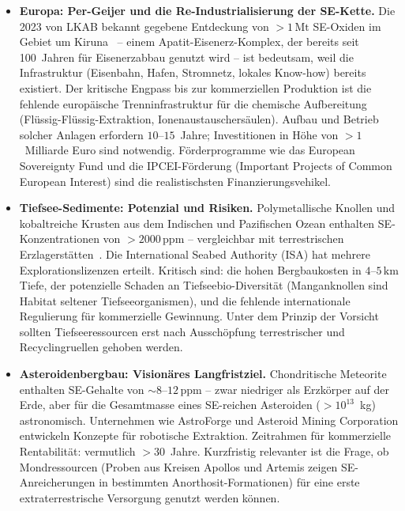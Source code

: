 ﻿\documentclass[12pt, a4paper]{report}
\theoremstyle{definition}
\theoremstyle{remark}
\begin{document}
\begin{itemize}
  \item \textbf{Europa: Per-Geijer und die Re-Industrialisierung der
        SE-Kette.}
    Die 2023 von LKAB bekannt gegebene Entdeckung von $>1\,\text{Mt}$
    SE-Oxiden im Gebiet um Kiruna~\cite{lkab2023} -- einem Apatit-Eisenerz-Komplex,
    der bereits seit 100~Jahren für Eisenerzabbau genutzt wird -- ist bedeutsam,
    weil die Infrastruktur (Eisenbahn, Hafen, Stromnetz, lokales Know-how)
    bereits existiert. Der kritische Engpass bis zur kommerziellen Produktion
    ist die fehlende europäische Trenninfrastruktur für die chemische
    Aufbereitung (Flüssig-Flüssig-Extraktion, Ionenaustauschersäulen). Aufbau
    und Betrieb solcher Anlagen erfordern $10$--$15$~Jahre; Investitionen in
    Höhe von $> 1$~Milliarde Euro sind notwendig. Förderprogramme wie das
    European Sovereignty Fund und die IPCEI-Förderung (Important Projects of
    Common European Interest) sind die realistischsten Finanzierungsvehikel.

  \item \textbf{Tiefsee-Sedimente: Potenzial und Risiken.}
    Polymetallische Knollen und kobaltreiche Krusten aus dem Indischen und
    Pazifischen Ozean enthalten SE-Konzentrationen von $>2000\,\text{ppm}$
    -- vergleichbar mit terrestrischen Erzlagerstätten~\cite{balaram2019}.
    Die International Seabed Authority (ISA) hat mehrere Explorationslizenzen
    erteilt. Kritisch sind: die hohen Bergbaukosten in $4$--$5\,\text{km}$
    Tiefe, der potenzielle Schaden an Tiefseebio-Diversität (Manganknollen
    sind Habitat seltener Tiefseeorganismen), und die fehlende internationale
    Regulierung für kommerzielle Gewinnung. Unter dem Prinzip der Vorsicht
    sollten Tiefseeressourcen erst nach Ausschöpfung terrestrischer und
    Recyclingruellen gehoben werden.

  \item \textbf{Asteroidenbergbau: Visionäres Langfristziel.}
    Chondritische Meteorite enthalten SE-Gehalte von $\sim 8$--$12\,\text{ppm}$
    -- zwar niedriger als Erzkörper auf der Erde, aber für die
    Gesamtmasse eines SE-reichen Asteroiden ($>10^{13}$~kg) astronomisch.
    Unternehmen wie AstroForge und Asteroid Mining Corporation entwickeln
    Konzepte für robotische Extraktion. Zeitrahmen für kommerzielle
    Rentabilität: vermutlich $>30$~Jahre. Kurzfristig relevanter ist die
    Frage, ob Mondressourcen (Proben aus Kreisen Apollos und Artemis zeigen
    SE-Anreicherungen in bestimmten Anorthosit-Formationen) für eine erste
    extraterrestrische Versorgung genutzt werden können.
\end{itemize}
\end{document}
